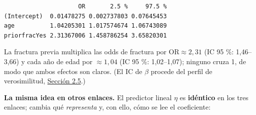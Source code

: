 \documentclass[
  letterpaper,
  DIV=11,
  numbers=noendperiod]{scrartcl}
\begin{document}
\begin{verbatim}
                     OR       2.5 %     97.5 %
(Intercept)  0.01478275 0.002737803 0.07645453
age          1.04205301 1.017574674 1.06743089
priorfracYes 2.31367006 1.458786254 3.65820301
\end{verbatim}

La fractura previa multiplica las odds de fractura por
\(\text{OR}\approx 2{,}31\) (IC 95 \%: 1,46--3,66) y cada año de edad
por \(\approx 1{,}04\) (IC 95 \%: 1,02--1,07); ninguno cruza 1, de modo
que ambos efectos son claros. (El IC de \(\beta\) procede del perfil de
verosimilitud, \protect\hyperlink{sec-u12-inferencia}{Sección 2.5}.)

\textbf{La misma idea en otros enlaces.} El predictor lineal \(\eta\) es
\textbf{idéntico} en los tres enlaces; cambia qué \emph{representa} y,
con ello, cómo se lee el coeficiente:
\end{document}
